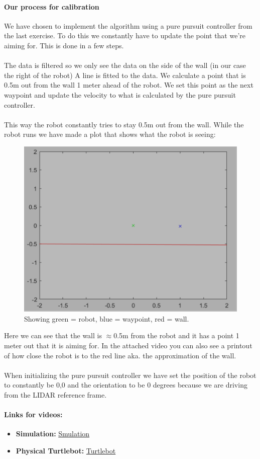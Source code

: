 \documentclass[12pt,a4paper]{article}
\begin{document}
	\paragraph{Our process for calibration}
	We have chosen to implement the algorithm using a pure pursuit controller from the last exercise. To do this we constantly have to update the point that we’re aiming for. This is done in a few steps.
	\\\\
	The data is filtered so we only see the data on the side of the wall (in our case the right of the robot)
	A line is fitted to the data.
	We calculate a point that is 0.5m out from the wall 1 meter ahead of the robot.
	We set this point as the next waypoint and update the velocity to what is calculated by the pure pursuit controller.
	\\\\
	This way the robot constantly tries to stay 0.5m out from the wall. While the robot runs we have made a plot that shows what the robot is seeing:
	\begin{figure}[!h]
		\centering
		\includegraphics[width=\textwidth]{fig7}
		\caption{Showing green = robot, blue = waypoint, red = wall.}
		\label{fig:fig7}
	\end{figure}
	
	Here we can see that the wall is $\approx$0.5m from the robot and it has a point 1 meter out that it is aiming for. In the attached video you can also see a printout of how close the robot is to the red line aka. the approximation of the wall.
	\\\\
	When initializing the pure pursuit controller we have set the position of the robot to constantly be 0,0 and the orientation to be 0 degrees because we are driving from the LIDAR reference frame. 
	\paragraph{Links for videos:}
	\begin{itemize}
		\item \textbf{Simulation:} \href{https://www.youtube.com/watch?v=JomIcrJGUDA}{Smulation}
		\item \textbf{Physical Turtlebot:} \href{https://youtu.be/y9jW8Li3KjQ}{Turtlebot}
	\end{itemize}
\end{document}
